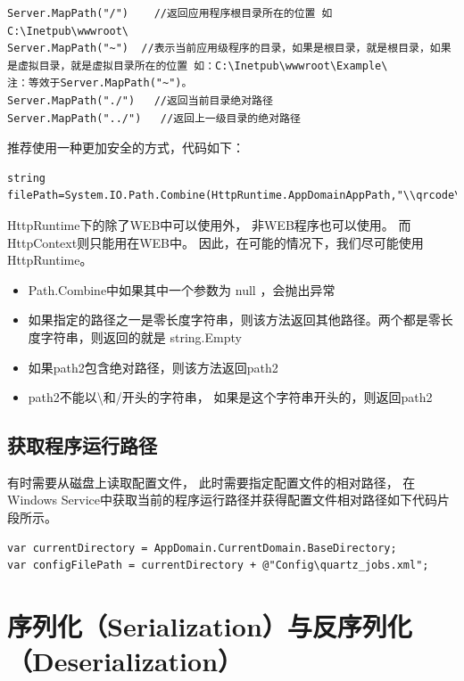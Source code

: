 \documentclass{book}
\begin{document}
\begin{lstlisting}
Server.MapPath("/")    //返回应用程序根目录所在的位置 如 C:\Inetpub\wwwroot\
Server.MapPath("~")  //表示当前应用级程序的目录，如果是根目录，就是根目录，如果是虚拟目录，就是虚拟目录所在的位置 如：C:\Inetpub\wwwroot\Example\
注：等效于Server.MapPath("~")。
Server.MapPath("./")   //返回当前目录绝对路径
Server.MapPath("../")   //返回上一级目录的绝对路径
\end{lstlisting}

推荐使用一种更加安全的方式，代码如下：

\begin{lstlisting}[language={[Sharp]C}]
string filePath=System.IO.Path.Combine(HttpRuntime.AppDomainAppPath,"\\qrcode\\a.png");
\end{lstlisting}

HttpRuntime下的除了WEB中可以使用外，
非WEB程序也可以使用。
而HttpContext则只能用在WEB中。
因此，在可能的情况下，我们尽可能使用HttpRuntime。

\begin{itemize}
\item{Path.Combine中如果其中一个参数为 null ，会抛出异常}
\item{如果指定的路径之一是零长度字符串，则该方法返回其他路径。两个都是零长度字符串，则返回的就是 string.Empty}
\item{如果path2包含绝对路径，则该方法返回path2}
\item{path2不能以\textbackslash 和/开头的字符串， 如果是这个字符串开头的，则返回path2}
\end{itemize}

\subsection{获取程序运行路径}

有时需要从磁盘上读取配置文件，
此时需要指定配置文件的相对路径，
在Windows Service中获取当前的程序运行路径并获得配置文件相对路径如下代码片段所示。

\begin{lstlisting}[language={[Sharp]C}]
var currentDirectory = AppDomain.CurrentDomain.BaseDirectory;
var configFilePath = currentDirectory + @"Config\quartz_jobs.xml";
\end{lstlisting}

\section{序列化（Serialization）与反序列化（Deserialization）}
\end{document}
